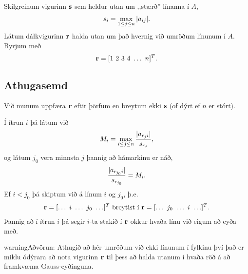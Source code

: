 \documentclass[letterpaper,10pt,icelandic]{sphinxmanual}
\begin{document}
Skilgreinum vigurinn \(\mbox{${\bf s}$}\) sem heldur utan um
,,stærð'' línanna í \(A\),
\begin{gather}
\begin{split}s_i = \max_{1\leq j \leq n} |a_{ij}|.\end{split}\notag
\end{gather}
Látum dálkvigurinn \(\mbox{${\bf r}$}\) halda utan um það hvernig
við umröðum línunum í \(A\). Byrjum með
\begin{gather}
\begin{split}\mbox{${\bf r}$}= [1\ 2\ 3\ 4\ \ldots\ n]^T.\end{split}\notag
\end{gather}

\subsection{Athugasemd}
\label{kafli08:athugasemd}
Við munum uppfæra \(\mbox{${\bf r}$}\) eftir þörfum en breytum ekki
\(\mbox{${\bf s}$}\) (of dýrt ef \(n\) er stórt).

Í ítrun \(i\) þá látum við
\begin{gather}
\begin{split}M_i = \max_{i \leq j \leq n} \frac{|a_{{r_j}i}|}{s_{r_j}},\end{split}\notag
\end{gather}
og látum \(j_0\) vera minnsta \(j\) þannig að hámarkinu er náð,
\begin{gather}
\begin{split}\frac{ |a_{r_{j_0}i}|}{s_{r_{j_0}}} = M_i.\end{split}\notag
\end{gather}
Ef \(i < j_0\) þá skiptum við á línum \(i\) og \(j_0\), þ.e.
\begin{gather}
\begin{split}\mbox{${\bf r}$}= [\ldots\ i\ \ldots\ j_0\ \ldots]^T \text{ breytist í }
\mbox{${\bf r}$}= [\ldots\ j_0\ \ldots\ i\ \ldots]^T.\end{split}\notag
\end{gather}
Þannig að í ítrun \(i\) þá segir \(i\)-ta stakið í
\(\bf r\) okkur hvaða línu við eigum að eyða með.

\begin{notice}{warning}{Aðvörun:}
Athugið að hér umröðum við ekki línunum í fylkinu því það er miklu ódýrara
að nota vigurinn \(\bf r\) til þess að halda utanum í hvaða röð á
að framkvæma Gauss-eyðinguna.
\end{notice}
\end{document}
